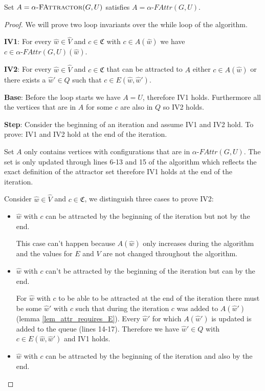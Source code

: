 \begin{theorem}
Set $A = \textsc{$\alpha$-FAttractor}(G,U)$ satisfies $A = \alpha\textit{-FAttr}(G,U)$.
	\begin{proof} We will prove two loop invariants over the while loop of the algorithm.
		
		\textbf{IV1}: For every $\hat{w} \in \hat{V}$ and $c \in \mathfrak{C}$ with $c \in A(\hat{w})$ we have $c \in \alpha\textit{-FAttr}(G,U)(\hat{w})$.
		
		\textbf{IV2}: For every $\hat{w} \in \hat{V}$ and $c \in \mathfrak{C}$ that can be attracted to $A$ either $c \in A(\hat{w})$ or there exists a $\hat{w}' \in Q$ such that $c \in E(\hat{w},\hat{w}')$.
		
		\textbf{Base}: Before the loop starts we have $A = U$, therefore IV1 holds. Furthermore all the vertices that are in $A$ for some $c$ are also in $Q$ so IV2 holds.
		
		\textbf{Step}: Consider the beginning of an iteration and assume IV1 and IV2 hold. To prove: IV1 and IV2 hold at the end of the iteration.
		
		Set $A$ only contains vertices with configurations that are in $\alpha\textit{-FAttr}(G,U)$. The set is only updated through lines 6-13 and 15 of the algorithm which reflects the exact definition of the attractor set therefore IV1 holds at the end of the iteration.
		
		Consider $\hat{w} \in \hat{V}$ and $c \in \mathfrak{C}$, we distinguish three cases to prove IV2:
		\begin{itemize}
			\item $\hat{w}$ with $c$ can be attracted by the beginning of the iteration but not by the end.
			
			This case can't happen because $A(\hat{w})$ only increases during the algorithm and the values for $E$ and $V$ are not changed throughout the algorithm.
			\item $\hat{w}$ with $c$ can't be attracted by the beginning of the iteration but can by the end.
			
			For $\hat{w}$ with $c$ to be able to be attracted at the end of the iteration there must be some $\hat{w}'$ with $c$ such that during the iteration $c$ was added to $A(\hat{w}')$ (lemma \ref{lem_attr_requires_E}). Every $\hat{w}'$ for which $A(\hat{w}')$ is updated is added to the queue (lines 14-17). Therefore we have $\hat{w}' \in Q$ with $c \in E(\hat{w},\hat{w}')$ and IV1 holds.
			\item $\hat{w}$ with $c$ can be attracted by the beginning of the iteration and also by the end.
			

\end{itemize}
\end{proof}
\end{theorem}
